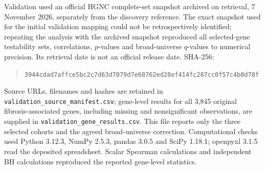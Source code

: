 \documentclass[10pt,a4paper]{article}
\begin{document}
Validation used an official HGNC complete-set snapshot archived on retrieval, 7 November 2026, separately from the discovery reference. The exact snapshot used for the initial validation mapping could not be retrospectively identified; repeating the analysis with the archived snapshot reproduced all selected-gene testability sets, correlations, $p$-values and broad-universe $q$-values to numerical precision. Its retrieval date is not an official release date. SHA-256:
\begin{quote}\footnotesize\texttt{3944cdad7affce5bc2c7d63d7079d7e68762ed28ef414fc287cc0f57c4b0d78f}\end{quote}
Source URLs, filenames and hashes are retained in \nolinkurl{validation_source_manifest.csv}; gene-level results for all 3,845 original fibrosis-associated genes, including missing and nonsignificant observations, are supplied in \nolinkurl{validation_gene_results.csv}. This file reports only the three selected cohorts and the agreed broad-universe correction. Computational checks used Python 3.12.3, NumPy 2.5.3, pandas 3.0.5 and SciPy 1.18.1; openpyxl 3.1.5 read the deposited spreadsheet. Scalar Spearman calculations and independent BH calculations reproduced the reported gene-level statistics.
\end{document}
